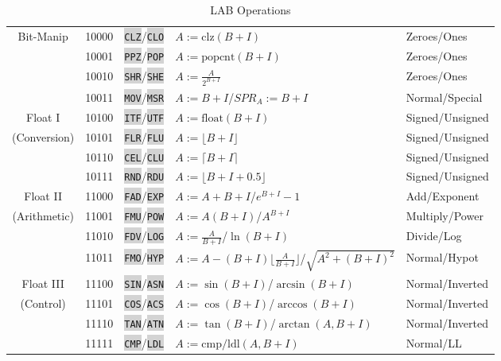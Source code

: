 \documentclass{article}
\newcommand{\labcode}[1]{\colorbox{lightgray}{\lstinline[language=lab]{#1}}}
\begin{document}
\begin{table}[h!]
\begin{tabular}{cclll}
    Bit-Manip   & 10000 & \labcode{CLZ}/\labcode{CLO} & $A := \mbox{clz}(B + I)$ & Zeroes/Ones \\
                & 10001 & \labcode{PPZ}/\labcode{POP} & $A := \mbox{popcnt}(B + I)$ & Zeroes/Ones \\
                & 10010 & \labcode{SHR}/\labcode{SHE} & $A := \frac{A}{2^{B + I}}$ & Zeroes/Ones \\ %
                & 10011 & \labcode{MOV}/\labcode{MSR} & $A := B + I$/$SPR_A := B + I$ & Normal/Special \\ \midrule
    Float I     & 10100 & \labcode{ITF}/\labcode{UTF} & $A := \mbox{float}(B + I)$ & Signed/Unsigned \\
    (Conversion)& 10101 & \labcode{FLR}/\labcode{FLU} & $A := \lfloor B + I \rfloor$ & Signed/Unsigned \\
                & 10110 & \labcode{CEL}/\labcode{CLU} & $A := \lceil B + I \rceil$ & Signed/Unsigned \\
                & 10111 & \labcode{RND}/\labcode{RDU} & $A := \lfloor B + I + 0.5 \rfloor$ & Signed/Unsigned \\ \midrule
    Float II    & 11000 & \labcode{FAD}/\labcode{EXP} & $A := A + B + I$/$e^{B+I} - 1$ & Add/Exponent \\
    (Arithmetic)& 11001 & \labcode{FMU}/\labcode{POW} & $A := A(B + I)$/$A^{B+I}$ & Multiply/Power \\
                & 11010 & \labcode{FDV}/\labcode{LOG} & $A := \frac{A}{B + I}$/$\ln(B + I)$ & Divide/Log \\
                & 11011 & \labcode{FMO}/\labcode{HYP} & $A := A - (B + I) \lfloor \frac{A}{B + I} \rfloor$/$\sqrt{A^2 + (B + I)^2}$ & Normal/Hypot \\ \midrule
    Float III   & 11100 & \labcode{SIN}/\labcode{ASN} & $A := \sin(B + I)$/$\arcsin(B + I)$ & Normal/Inverted \\
    (Control)   & 11101 & \labcode{COS}/\labcode{ACS} & $A := \cos(B + I)$/$\arccos(B + I)$ & Normal/Inverted \\
                & 11110 & \labcode{TAN}/\labcode{ATN} & $A := \tan(B + I)$/$\arctan(A, B + I)$ & Normal/Inverted \\
                & 11111 & \labcode{CMP}/\labcode{LDL} & $A := \mbox{cmp}/\mbox{ldl}(A,B+I)$ & Normal/LL \\ \midrule
\end{tabular}
\caption{LAB Operations}
\label{table:operations}
\end{table}
\end{document}
